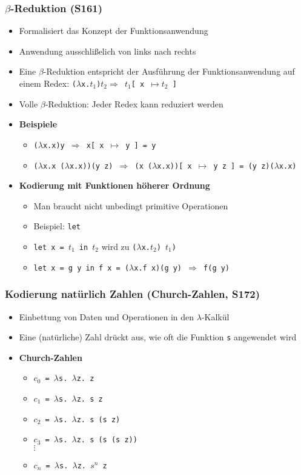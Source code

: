 \subsubsection{$\beta$-Reduktion (S161)}
\begin{itemize}
	\item Formalisiert das Konzept der Funktionsanwendung
	\item Anwendung ausschlißelich von links nach rechts
	\item Eine \(\beta\)-Reduktion entspricht der Ausführung der Funktionsanwendung auf einem Redex: \texttt{(\(\lambda\)x.\(t_1\))\(t_2 \Rightarrow\) \(t_1\){[} x \(\mapsto t_2\) {]}}
	\item Volle \(\beta\)-Reduktion: Jeder Redex kann reduziert werden
	\item \textbf{Beispiele}
	\begin{itemize}
		\item \texttt{(\(\lambda\)x.x)y \(\Rightarrow\) x{[} x \(\mapsto\) y {]} = y}
		\item \texttt{(\(\lambda\)x.x (\(\lambda\)x.x))(y z) \(\Rightarrow\) (x (\(\lambda\)x.x)){[} x \(\mapsto\) y z {]} = (y z)(\(\lambda\)x.x)}
	\end{itemize}
	\item \textbf{Kodierung mit Funktionen höherer Ordnung}
	\begin{itemize}
		\item Man braucht nicht unbedingt primitive Operationen
		\item Beispiel: \texttt{let}
		\item \texttt{let x = \(t_1\) in \(t_2\)} wird zu \texttt{(\(\lambda\)x.\(t_2\)) \(t_1\))}
		\item \texttt{let x = g y in f x = (\(\lambda\)x.f x)(g y) \(\Rightarrow\) f(g y)}
	\end{itemize}
\end{itemize}

\subsubsection{Kodierung natürlich Zahlen (Church-Zahlen, S172)}
\begin{itemize}
	\item Einbettung von Daten und Operationen in den \(\lambda\)-Kalkül
	\item Eine (natürliche) Zahl drückt aus, wie oft die Funktion \texttt{s} angewendet wird
	\item \textbf{Church-Zahlen}
	\begin{itemize}
		\item \texttt{\(c_0\) = \(\lambda\)s. \(\lambda\)z. z}
		\item \texttt{\(c_1\) = \(\lambda\)s. \(\lambda\)z. s z}
		\item \texttt{\(c_2\) = \(\lambda\)s. \(\lambda\)z. s (s z)}
		\item \texttt{\(c_3\) = \(\lambda\)s. \(\lambda\)z. s (s (s z))} \\ \(\vdots\)
		\item \texttt{\(c_n\) = \(\lambda\)s. \(\lambda\)z. \(s^n\) z}
	\end{itemize}
\end{itemize}

